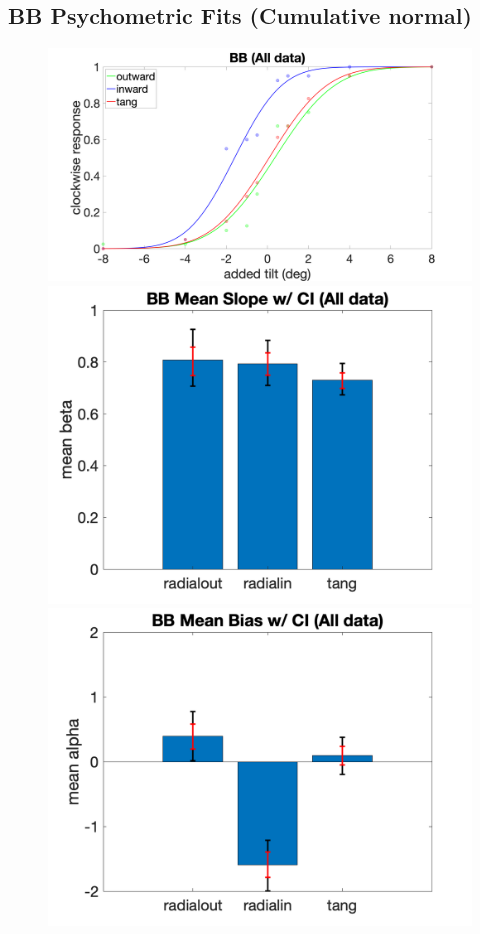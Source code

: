\documentclass[11pt]{article} %
\begin{document}
\subsection{BB Psychometric Fits (Cumulative normal)}
\begin{figure}[H]
\centering %
\includegraphics[scale=.06]{Images/PF_BB_allcond.png}
\includegraphics[scale=.11]{Images/MeanSlopeError_ci_BB_allcond.png}
\includegraphics[scale=.11]{Images/MeanBiasError_ci_BB_allcond.png}

\end{figure}
\end{document}
